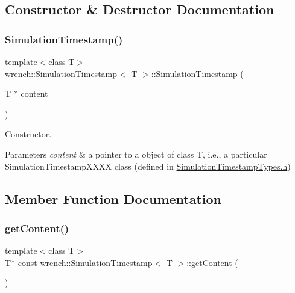\subsection{Constructor \& Destructor Documentation}
\mbox{\label{classwrench_1_1_simulation_timestamp_ad09714038c918230df20966d78b0201e}} 
\subsubsection{\texorpdfstring{Simulation\+Timestamp()}{SimulationTimestamp()}}
{\footnotesize\ttfamily template$<$class T$>$ \\
\hyperlink{classwrench_1_1_simulation_timestamp}{wrench\+::\+Simulation\+Timestamp}$<$ T $>$\+::\hyperlink{classwrench_1_1_simulation_timestamp}{Simulation\+Timestamp} (\begin{DoxyParamCaption}\item[{T $\ast$}]{content }\end{DoxyParamCaption})\hspace{0.3cm}{\ttfamily [inline]}}



Constructor. 


\begin{DoxyParams}{Parameters}
{\em content} & a pointer to a object of class T, i.\+e., a particular Simulation\+Timestamp\+X\+X\+XX class (defined in \hyperlink{_simulation_timestamp_types_8h_source}{Simulation\+Timestamp\+Types.\+h}) \\
\hline
\end{DoxyParams}


\subsection{Member Function Documentation}
\mbox{\label{classwrench_1_1_simulation_timestamp_a8ae8b15faae854fb1615a700fd620ab8}} 
\subsubsection{\texorpdfstring{get\+Content()}{getContent()}}
{\footnotesize\ttfamily template$<$class T$>$ \\
T$\ast$ const \hyperlink{classwrench_1_1_simulation_timestamp}{wrench\+::\+Simulation\+Timestamp}$<$ T $>$\+::get\+Content (\begin{DoxyParamCaption}{ }\end{DoxyParamCaption})\hspace{0.3cm}{\ttfamily [inline]}}

